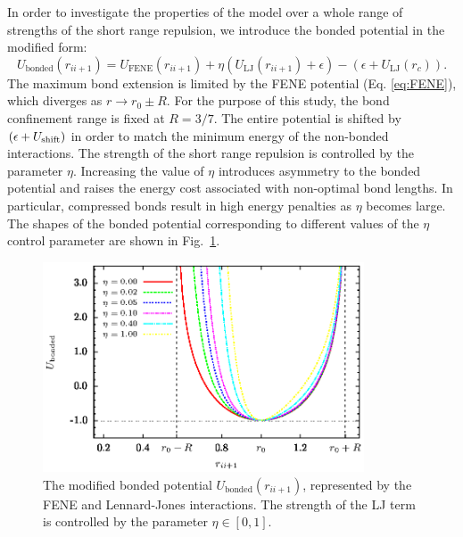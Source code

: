 \documentclass[12pt]{report}
\begin{document}
In order to investigate the properties of the model over a whole range of strengths of the short range repulsion, we introduce the bonded potential in the modified form:
%
\begin{equation}
\label{eq:BondedInteractionModified}
U_{\mathrm{bonded}}(r_{ii+1}) = U_{\mathrm{FENE}}(r_{ii+1}) + \eta \left(U_{\mathrm{LJ}}(r_{ii+1}) + \epsilon\right) - \left(\epsilon + U_{\mathrm{LJ}}(r_{c})\right).
\end{equation}
%
The maximum bond extension is limited by the FENE potential (Eq.\,\,\ref{eq:FENE}), which diverges as $r \rightarrow r_0 \pm R$. For the purpose of this study, the bond confinement range is fixed at $R = 3/7$. The entire potential is shifted by $(\epsilon+U_{\rm shift})$ in order to match the minimum energy of the non-bonded interactions. The strength of the short range repulsion is controlled by the parameter $\eta$. Increasing the value of $\eta$ introduces asymmetry to the bonded potential and raises the energy cost associated with non-optimal bond lengths. In particular, compressed bonds result in high energy penalties as $\eta$ becomes large. The shapes of the bonded potential corresponding to different values of the $\eta$ control parameter are shown in Fig.~\ref{fig:modifiedBondedPotential}. 
%
\begin{figure}
\center
\includegraphics[width=0.85\textwidth]{chapter6Figs/bondedInter.eps}\hspace{2pc}%
\caption{\label{fig:modifiedBondedPotential} The modified bonded potential $U_{\mathrm{bonded}}(r_{ii+1})$, represented by the FENE and Lennard-Jones interactions. The strength of the LJ term is controlled by the parameter $\eta \in [0,1]$.}
\end{figure}
\end{document}
